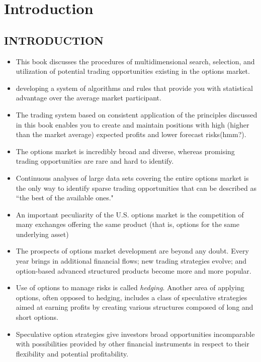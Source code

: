 

\chapter*{Introduction}


    \section*{INTRODUCTION}
        \begin{itemize}
            \item This book discusses the procedures of multidimensional search, selection, and utilization of potential trading opportunities existing in the options market.
            \item developing a system of algorithms and rules that provide you with statistical advantage over the average market participant.
            \item The trading system based on consistent application of the principles discussed in this book enables you to create and maintain positions with high (higher than the market average) expected profits and lower forecast risks(hmm?).
            \item The options market is incredibly broad and diverse, whereas promising trading opportunities are rare and hard to identify.
            \item Continuous analyses of large data sets covering the entire options market is the only way to identify sparse trading opportunities that can be described as ``the best of the available ones."
            \item An important peculiarity of the U.S. options market is the competition of many exchanges offering the same product (that is, options for the same underlying asset)
            \item The prospects of options market development are beyond any doubt. Every year brings in additional financial flows; new trading strategies evolve; and option-based advanced structured products become more and more popular.
            \item Use of options to manage risks is called \textit{hedging}. Another area of applying options, often opposed to hedging, includes a class of speculative strategies aimed at earning profits by creating various structures composed of long and short options.
            \item Speculative option strategies give investors broad opportunities incomparable with possibilities provided by other financial instruments in respect to their flexibility and potential profitability.

\end{itemize}
